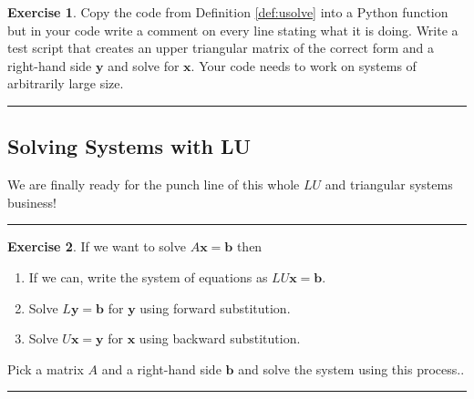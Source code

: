 \documentclass[
]{book}
\providecommand{\tightlist}{%
  \setlength{\itemsep}{0pt}\setlength{\parskip}{0pt}}
\theoremstyle{definition}
\theoremstyle{definition}
\theoremstyle{definition}
\newtheorem{exercise}{Exercise}[chapter]
\theoremstyle{remark}
\begin{document}
\begin{exercise}
\protect\hypertarget{exr:unnamed-chunk-332}{}{\label{exr:unnamed-chunk-332} }Copy the code from Definition \ref{def:usolve} into a Python function but in your code write a comment on every line stating what it is doing. Write a test script that creates an upper triangular matrix of the correct form and a right-hand side \(\boldsymbol{y}\) and solve for \(\boldsymbol{x}\). Your code needs to work on
systems of arbitrarily large size.
\end{exercise}

\begin{center}\rule{0.5\linewidth}{0.5pt}\end{center}

\hypertarget{solving-systems-with-lu}{%
\subsection{Solving Systems with LU}\label{solving-systems-with-lu}}

We are finally ready for the punch line of this whole \(LU\) and triangular systems business!

\begin{center}\rule{0.5\linewidth}{0.5pt}\end{center}

\begin{exercise}
\protect\hypertarget{exr:unnamed-chunk-333}{}{\label{exr:unnamed-chunk-333} }If we want to solve \(A \boldsymbol{x} = \boldsymbol{b}\) then

\begin{enumerate}
\def\labelenumi{\alph{enumi}.}
\tightlist
\item
  If we can, write the system of equations as \(LU \boldsymbol{x} = \boldsymbol{b}\).
\item
  Solve \(L \boldsymbol{y} = \boldsymbol{b}\) for \(\boldsymbol{y}\) using forward substitution.
\item
  Solve \(U \boldsymbol{x} = \boldsymbol{y}\) for \(\boldsymbol{x}\) using backward substitution.
\end{enumerate}

Pick a matrix \(A\) and a right-hand side \(\boldsymbol{b}\) and solve the system using this process..
\end{exercise}

\begin{center}\rule{0.5\linewidth}{0.5pt}\end{center}
\end{document}
